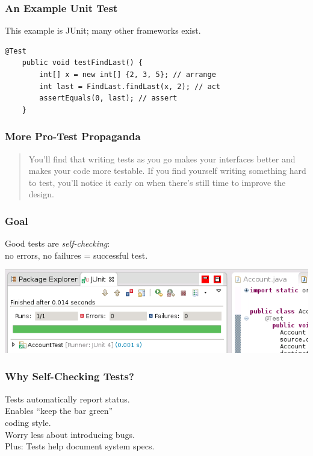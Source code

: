 \documentclass{beamer}
\newenvironment{changemargin}[1]{%
  \begin{list}{}{%
    \setlength{\topsep}{0pt}%
    \setlength{\leftmargin}{#1}%
    \setlength{\rightmargin}{1em}
    \setlength{\listparindent}{\parindent}%
    \setlength{\itemindent}{\parindent}%
    \setlength{\parsep}{\parskip}%
  }%
  \item[]}{\end{list}}
\begin{document}
\begin{frame}[fragile]
  \frametitle{An Example Unit Test}
  \begin{changemargin}{1em}

    {\Large
      This example is JUnit; many other frameworks exist.\\[1em]
      }
    
    \begin{lstlisting}[]
    @Test
    public void testFindLast() {
        int[] x = new int[] {2, 3, 5}; // arrange
        int last = FindLast.findLast(x, 2); // act
        assertEquals(0, last); // assert
    }
\end{lstlisting}

  \end{changemargin}
\end{frame}

\begin{frame}[fragile]
  \frametitle{More Pro-Test Propaganda}
  \begin{changemargin}{1em}

    {\Large
\begin{quote}
You'll find that writing tests as you go makes your interfaces better and makes your code more testable. If you find yourself writing something hard to test, you'll notice it early on when there's still time to improve the design.
\end{quote}
}
  \end{changemargin}
\end{frame}
\begin{frame}
  \frametitle{Goal}

  \Large
  \begin{changemargin}{2cm}
    Good tests are \emph{self-checking}:\\[1em]
    no errors, no failures = successful test.
  \end{changemargin}

  \begin{center}
    \includegraphics[width=.6\textwidth]{L02/pass}
  \end{center}
  
\end{frame}

\begin{frame}
  \frametitle{Why Self-Checking Tests?}

  \Large
  \begin{changemargin}{2cm}
    Tests automatically report status.\\[1em]
    Enables ``keep the bar green''\\
    coding style.\\[1em]
    Worry less about introducing bugs.\\[1em]
    Plus: Tests help document system specs.
  \end{changemargin}
\end{frame}
\end{document}
